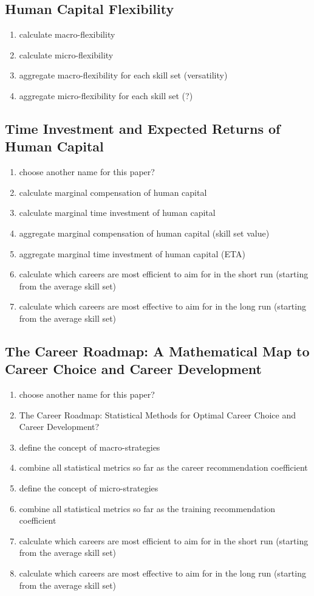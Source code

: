 \documentclass{elsarticle} %
\begin{document}
\subsection{Human Capital Flexibility}
\begin{enumerate}
    \item calculate macro-flexibility
    \item calculate micro-flexibility
    \item aggregate macro-flexibility for each skill set (versatility)
    \item aggregate micro-flexibility for each skill set (?)
\end{enumerate}

\subsection{Time Investment and Expected Returns of Human Capital}
\begin{enumerate}
    \item choose another name for this paper?
    \item calculate marginal compensation of human capital
    \item calculate marginal time investment of human capital
    \item aggregate marginal compensation of human capital (skill set value)
    \item aggregate marginal time investment of human capital (ETA)
    \item calculate which careers are most efficient to aim for in the short run
          (starting from the average skill set)
    \item calculate which careers are most effective to aim for in the long run (starting
          from the average skill set)
\end{enumerate}

\subsection{The Career Roadmap: A Mathematical Map to Career Choice and Career Development}
\begin{enumerate}
    \item choose another name for this paper?
    \item The Career Roadmap: Statistical Methods for Optimal Career Choice and Career
          Development?
    \item define the concept of macro-strategies
    \item combine all statistical metrics so far as the career recommendation coefficient
    \item define the concept of micro-strategies
    \item combine all statistical metrics so far as the training recommendation
          coefficient
    \item calculate which careers are most efficient to aim for in the short run
          (starting from the average skill set)
    \item calculate which careers are most effective to aim for in the long run (starting
          from the average skill set)
\end{enumerate}
\end{document}
